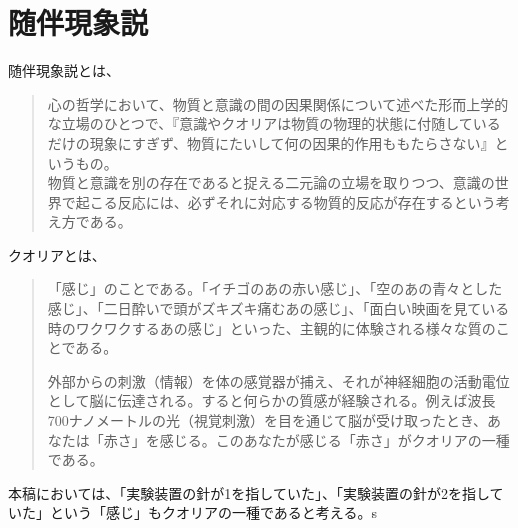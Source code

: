 \section{随伴現象説}
随伴現象説とは、
\begin{quotation}
心の哲学において、物質と意識の間の因果関係について述べた形而上学的な立場のひとつで、『意識やクオリアは物質の物理的状態に付随しているだけの現象にすぎず、物質にたいして何の因果的作用ももたらさない』というもの。\\物質と意識を別の存在であると捉える二元論の立場を取りつつ、意識の世界で起こる反応には、必ずそれに対応する物質的反応が存在するという考え方である。\cite{wikipedia}
\end{quotation}
クオリアとは、
\begin{quotation}
「感じ」のことである。「イチゴのあの赤い感じ」、「空のあの青々とした感じ」、「二日酔いで頭がズキズキ痛むあの感じ」、「面白い映画を見ている時のワクワクするあの感じ」といった、主観的に体験される様々な質のことである。\par
外部からの刺激（情報）を体の感覚器が捕え、それが神経細胞の活動電位として脳に伝達される。すると何らかの質感が経験される。例えば波長700ナノメートルの光（視覚刺激）を目を通じて脳が受け取ったとき、あなたは「赤さ」を感じる。このあなたが感じる「赤さ」がクオリアの一種である。\cite{wikipediaa}
\end{quotation}
本稿においては、「実験装置の針が1を指していた」、「実験装置の針が2を指していた」という「感じ」もクオリアの一種であると考える。s